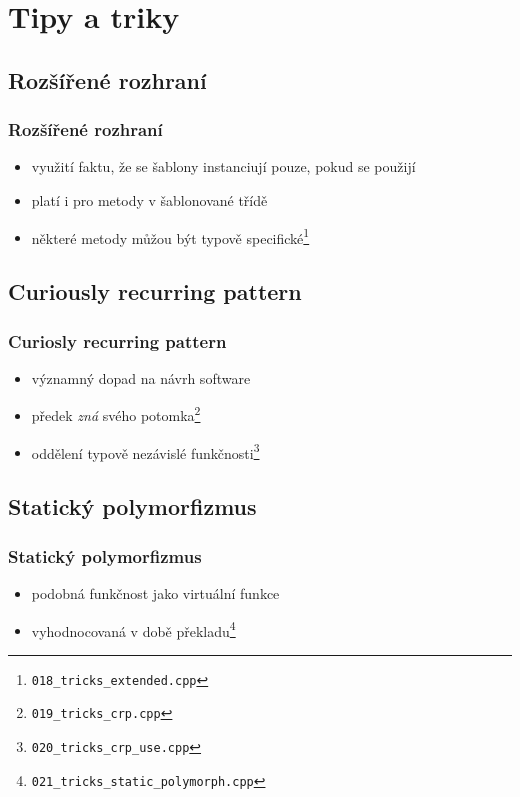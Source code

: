 	\section{Tipy a triky}
	\subsection{Rozšířené rozhraní}

	\begin{frame}
		\frametitle{Rozšířené rozhraní}
		\begin{itemize}
			\item{využití faktu, že se šablony instanciují pouze, pokud se použijí}
			\item{platí i pro metody v šablonované třídě}
			\item{některé metody můžou být typově specifické\footnote{\texttt{018\_tricks\_extended.cpp}}}
		\end{itemize}
	\end{frame}

	\subsection{Curiously recurring pattern}

	\begin{frame}
		\frametitle{Curiosly recurring pattern}
		\begin{itemize}
			\item{významný dopad na návrh software}
			\item{předek \textit{zná} svého potomka\footnote{\texttt{019\_tricks\_crp.cpp}}}
			\item{oddělení typově nezávislé funkčnosti\footnote{\texttt{020\_tricks\_crp\_use.cpp}}}
		\end{itemize}
	\end{frame}

	\subsection{Statický polymorfizmus}

	\begin{frame}
		\frametitle{Statický polymorfizmus}
		\begin{itemize}
			\item{podobná funkčnost jako virtuální funkce}
			\item{vyhodnocovaná v době překladu\footnote{\texttt{021\_tricks\_static\_polymorph.cpp}}}
		\end{itemize}
	\end{frame}

